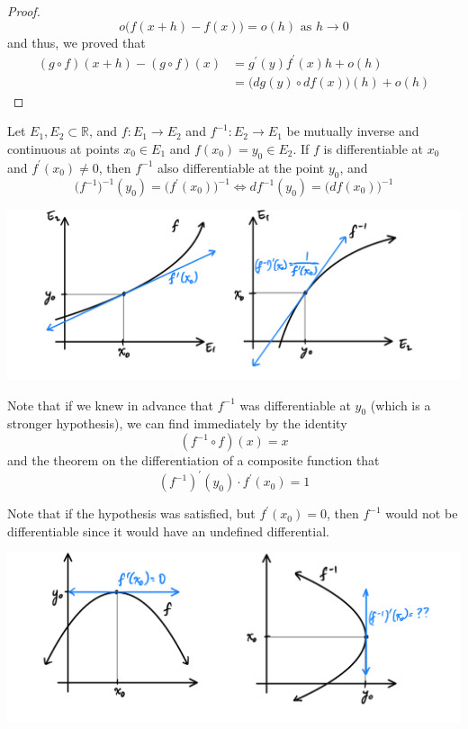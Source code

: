 \documentclass{article}
\begin{document}
\begin{proof}
    \[o\big(f(x + h) - f(x) \big) = o(h) \text{ as } h \rightarrow 0\]
    and thus, we proved that
    \begin{align*}
        (g \circ f)(x + h) - (g \circ f)(x) & = g^\prime (y) f^\prime (x) h + o(h) \\
        & = \big(dg(y) \circ df(x)\big) (h) + o(h)
    \end{align*}
    \end{proof}

    \begin{theorem}
    Let $E_1, E_2 \subset \mathbb{R}$, and $f: E_1 \longrightarrow E_2$ and $f^{-1}: E_2 \longrightarrow E_1$ be mutually inverse and continuous at points $x_0 \in E_1$ and $f(x_0) = y_0 \in E_2$. If $f$ is differentiable at $x_0$ and $f^\prime(x_0) \neq 0$, then $f^{-1}$ also differentiable at the point $y_0$, and 
    \[\big(f^{-1}\big)^{-1} (y_0) = \big(f^\prime (x_0)\big)^{-1} \iff df^{-1} (y_0) = \big(df(x_0)\big)^{-1}\]
    \begin{center}
        \includegraphics[scale=0.25]{img/Real_Analysis_Differentiation_Inverse_Functions.PNG}
    \end{center}
    Note that if we knew in advance that $f^{-1}$ was differentiable at $y_0$ (which is a stronger hypothesis), we can find immediately by the identity 
    \[(f^{-1} \circ f) (x) = x\]  
    and the theorem on the differentiation of a composite function that
    \[(f^{-1})^\prime (y_0) \cdot f^\prime (x_0) = 1\]
    \end{theorem}

    Note that if the hypothesis was satisfied, but $f^\prime (x_0) = 0$, then $f^{-1}$ would not be differentiable since it would have an undefined differential. 
    \begin{center}
        \includegraphics[scale=0.3]{img/Inverse_Function_Differentiation_Derivative_Zero_problem.PNG}
    \end{center}
\end{document}
